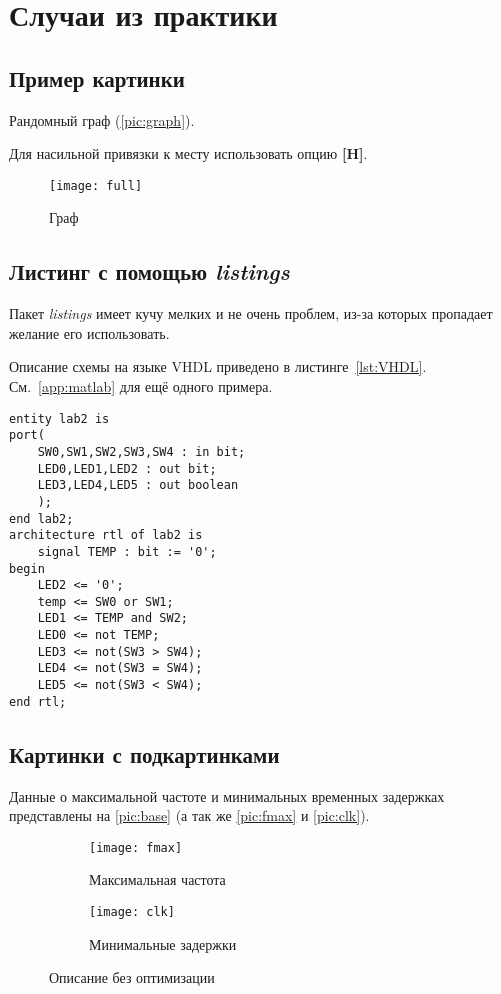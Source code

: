 \section{Случаи из практики}

\subsection{Пример картинки}

Рандомный граф (\vref{pic:graph}). 

Для насильной привязки к месту использовать опцию \textbf{[H]}. \cite{float}

\begin{figure}[H]
	\centering
	\texttt{[image: full]}
	\caption{Граф}
	\label{pic:graph}
\end{figure}

\subsection{Листинг с помощью \emph{listings}}

Пакет \emph{listings} имеет кучу мелких и не очень проблем, из-за которых пропадает желание его использовать.

Описание схемы на языке VHDL приведено в листинге~\vref{lst:VHDL}.
См.~\vref{app:matlab} для ещё одного примера.

\lstset{style=vhdl}
\begin{lstlisting}[label=lst:VHDL,caption=Описание схемы]
entity lab2 is
port(
	SW0,SW1,SW2,SW3,SW4 : in bit;
	LED0,LED1,LED2 : out bit;
	LED3,LED4,LED5 : out boolean
	);
end lab2;
architecture rtl of lab2 is
	signal TEMP : bit := '0';
begin
	LED2 <= '0';
	temp <= SW0 or SW1;
	LED1 <= TEMP and SW2;
	LED0 <= not TEMP;
	LED3 <= not(SW3 > SW4);
	LED4 <= not(SW3 = SW4);
	LED5 <= not(SW3 < SW4);
end rtl;
\end{lstlisting}

\subsection{Картинки с подкартинками}

Данные о максимальной частоте и минимальных временных задержках представлены на \vref{pic:base} (а так же \vref{pic:fmax} и \vref{pic:clk}). \cite{subcap}

\begin{figure}[H]
	\begin{subfigure}{.4\linewidth}
		\centering
		\texttt{[image: fmax]}
		\caption{Максимальная частота}
		\label{pic:fmax}
	\end{subfigure}
	\begin{subfigure}{.6\linewidth}
		\centering
		\texttt{[image: clk]}
		\caption{Минимальные задержки}
		\label{pic:clk}
	\end{subfigure}
\caption{Описание без оптимизации}
\label{pic:base}
\end{figure}

